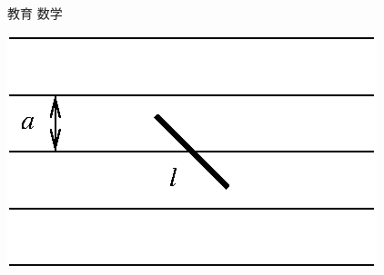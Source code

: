 \documentclass[fleqn]{jbook}
\begin{document}
\begin{question}{教育 数学}{}
\begin{subquestions}
{  }\parbox[t]{55mm}{\vspace*{-5mm}
  \begin{center}
    \mbox{\includegraphics[clip]{1995math-1.eps}}
  \end{center}}



\end{subquestions}
\end{question}
\end{document}
